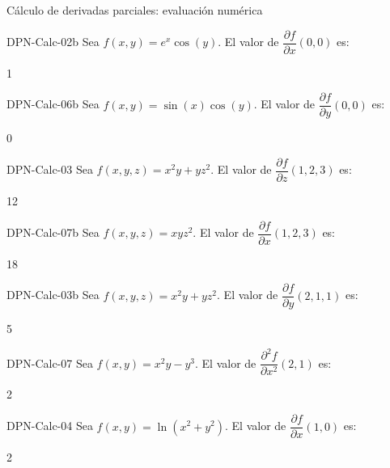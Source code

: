 \documentclass[a4,11pt]{aleph-notas}
\begin{document}
\begin{quiz}{Cálculo de derivadas parciales: evaluación numérica}
\begin{numerical}[tolerance=0.01]%
    {DPN-Calc-02b}
    Sea $f(x,y) = e^x \cos(y)$. El valor de $\dfrac{\partial f}{\partial x}(0,0)$ es:
    \item 1
\end{numerical}

\begin{numerical}[tolerance=0.01]%
    {DPN-Calc-06b}
    Sea $f(x,y) = \sin(x)\cos(y)$. El valor de $\dfrac{\partial f}{\partial y}(0,0)$ es:
    \item 0
\end{numerical}

\begin{numerical}[tolerance=0.01]%
    {DPN-Calc-03}
    Sea $f(x,y,z) = x^2 y + yz^2$. El valor de $\dfrac{\partial f}{\partial z}(1,2,3)$ es:
    \item 12
\end{numerical}

\begin{numerical}[tolerance=0.01]%
    {DPN-Calc-07b}
    Sea $f(x,y,z) = xyz^2$. El valor de $\dfrac{\partial f}{\partial x}(1,2,3)$ es:
    \item 18
\end{numerical}

\begin{numerical}[tolerance=0.01]%
    {DPN-Calc-03b}
    Sea $f(x,y,z) = x^2 y + yz^2$. El valor de $\dfrac{\partial f}{\partial y}(2,1,1)$ es:
    \item 5
\end{numerical}

\begin{numerical}[tolerance=0.01]%
    {DPN-Calc-07}
    Sea $f(x,y) = x^2 y - y^3$. El valor de $\dfrac{\partial^2 f}{\partial x^2}(2,1)$ es:
    \item 2
\end{numerical}

\begin{numerical}[tolerance=0.01]%
    {DPN-Calc-04}
    Sea $f(x,y) = \ln(x^2 + y^2)$. El valor de $\dfrac{\partial f}{\partial x}(1,0)$ es:
    \item 2
\end{numerical}



\end{quiz}
\end{document}
